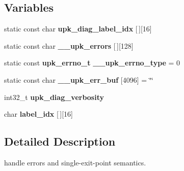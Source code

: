 \subsection*{Variables}
\begin{DoxyCompactItemize}
\item 
static const char {\bf upk\_\-diag\_\-label\_\-idx} [$\,$][16]
\item 
static const char {\bf \_\-\_\-upk\_\-errors} [$\,$][128]
\item 
static const {\bf upk\_\-errno\_\-t} {\bf \_\-\_\-upk\_\-errno\_\-type} = 0
\item 
static const char {\bf \_\-\_\-upk\_\-err\_\-buf} [4096] = \char`\"{}\char`\"{}
\item 
int32\_\-t {\bf upk\_\-diag\_\-verbosity}
\item 
char {\bf label\_\-idx} [$\,$][16]
\end{DoxyCompactItemize}


\subsection{Detailed Description}
handle errors and single-\/exit-\/point semantics. 